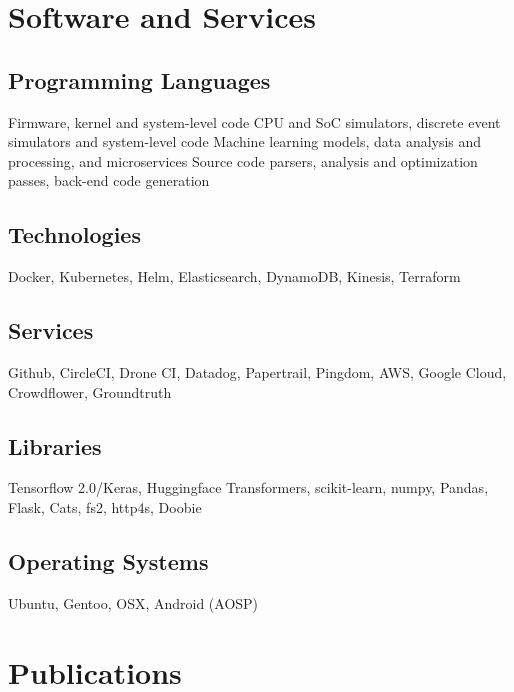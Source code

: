 \documentclass[11pt,a4paper,sans]{moderncv}
\begin{document}

\section{Software and Services}
\subsection{Programming Languages}
 {\small
Firmware, kernel and system-level code
}
 {\small
CPU and SoC simulators, discrete event simulators and system-level code
}
 {\small
Machine learning models, data analysis and processing, and microservices
}
 {\small
Source code parsers, analysis and optimization passes, back-end code generation
}

\subsection{Technologies}
\cvitem{} {\small
Docker, Kubernetes, Helm, Elasticsearch, DynamoDB, Kinesis, Terraform
}

\subsection{Services}
\cvitem{} {\small
Github, CircleCI, Drone CI, Datadog, Papertrail, Pingdom, AWS, Google Cloud, Crowdflower, Groundtruth
}

\subsection{Libraries}
\cvitem{} {\small
Tensorflow 2.0/Keras, Huggingface Transformers, scikit-learn, numpy, Pandas, Flask, Cats, fs2, http4s, Doobie
}

\subsection{Operating Systems}
\cvitem{} {\small
Ubuntu, Gentoo, OSX, Android (AOSP)
}

\section{Publications}
\end{document}
